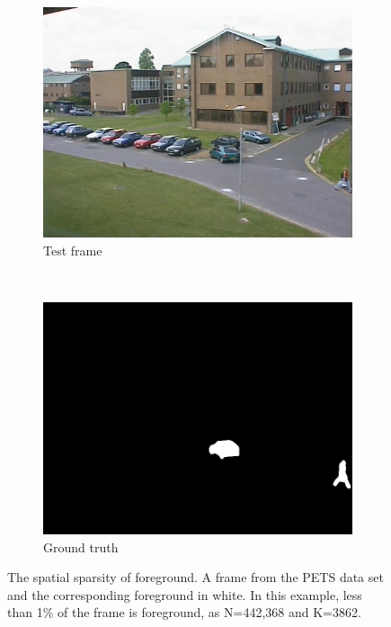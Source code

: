 \documentclass[conference]{IEEEtran}
\begin{document}
\begin{figure}
        \centering
        \begin{subfigure}[b]{0.2\textwidth}
                \centering
                \includegraphics[width=\textwidth]{camReal}
                \caption{Test frame}
        \end{subfigure}%
        ~ %
        \begin{subfigure}[b]{0.2\textwidth}
                \centering
                \includegraphics[width=\textwidth]{camGT}
                \caption{Ground truth}
        \end{subfigure}
\caption{The spatial sparsity of foreground. A frame from the PETS data set  \cite{pets2001} and the corresponding foreground in white. In this example, less than 1\% of the frame is foreground, as N=442,368 and K=3862.  }\label{fig:sparse}
\end{figure}
\end{document}
